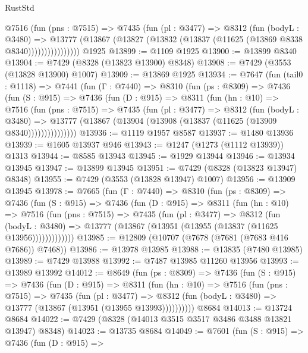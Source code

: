 \begin{lexlean}{RustStd}
\begin{coremodule}
                @7516
                  (fun (pns : @7515) =>
                  @7435
                    (fun (pl : @3477) =>
                    @8312
                      (fun (bodyL : @3480) =>
                      @13777
                        (@13867 (@13827 (@13832 (@13837 (@11625 (@13869 @8338 @8340))))))))))))))))
    @1925
@13899 := @1109 @1925
@13900 := @13899 @8340
@13904 := @7429 (@8328 (@13823 @13900) @8348)
@13908 := @7429 (@3553 (@13828 @13900) @1007)
@13909 := @13869 @1925
@13934 := @7647
    (fun (tail0 : @1118) =>
    @7441
      (fun (Γ : @7440) =>
      @8310
        (fun (ps : @8309) =>
        @7436
          (fun (S : @915) =>
          @7436
            (fun (D : @915) =>
            @8311
              (fun (hn : @10) =>
              @7516
                (fun (pns : @7515) =>
                @7435
                  (fun (pl : @3477) =>
                  @8312
                    (fun (bodyL : @3480) =>
                    @13777 (@13867 (@13904 (@13908 (@13837 (@11625 (@13909 @8340)))))))))))))))
@13936 := @1119 @1957 @8587
@13937 := @1480 @13936
@13939 := @1605 @13937 @946
@13943 := @1247 (@1273 (@1112 @13939)) @1313
@13944 := @8585 @13943
@13945 := @1929 @13944
@13946 := @13934 @13945
@13947 := @13899 @13945
@13951 := @7429 (@8328 (@13823 @13947) @8348)
@13955 := @7429 (@3553 (@13828 @13947) @1007)
@13956 := @13909 @13945
@13978 := @7665
    (fun (Γ : @7440) =>
    @8310
      (fun (ps : @8309) =>
      @7436
        (fun (S : @915) =>
        @7436
          (fun (D : @915) =>
          @8311
            (fun (hn : @10) =>
            @7516
              (fun (pns : @7515) =>
              @7435
                (fun (pl : @3477) =>
                @8312
                  (fun (bodyL : @3480) =>
                  @13777 (@13867 (@13951 (@13955 (@13837 (@11625 @13956)))))))))))))
@13985 := @12809 (@10707 (@7678 (@7681 (@7683 @416 @7686)) @7468))
@13986 := @13978 @13985
@13988 := @13835 (@7480 @13985)
@13989 := @7429 @13988
@13992 := @7487 @13985 @11260 @13956
@13993 := @13989 @13992
@14012 := @8649
    (fun (ps : @8309) =>
    @7436
      (fun (S : @915) =>
      @7436
        (fun (D : @915) =>
        @8311
          (fun (hn : @10) =>
          @7516
            (fun (pns : @7515) =>
            @7435
              (fun (pl : @3477) =>
              @8312 (fun (bodyL : @3480) => @13777 (@13867 (@13951 (@13955 @13993))))))))))
    @8684
@14013 := @13724 @8684
@14022 := @7429 (@8328 (@14013 @3515 @3517 @3486 @3488 @13821 @13947) @8348)
@14023 := @13735 @8684
@14049 := @7601
    (fun (S : @915) =>
    @7436
      (fun (D : @915) =>

\end{coremodule}
\end{lexlean}
